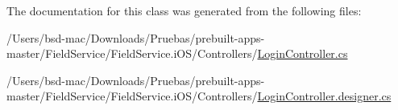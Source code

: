 The documentation for this class was generated from the following files\+:\begin{DoxyCompactItemize}
\item 
/\+Users/bsd-\/mac/\+Downloads/\+Pruebas/prebuilt-\/apps-\/master/\+Field\+Service/\+Field\+Service.\+i\+O\+S/\+Controllers/\hyperlink{_login_controller_8cs}{Login\+Controller.\+cs}\item 
/\+Users/bsd-\/mac/\+Downloads/\+Pruebas/prebuilt-\/apps-\/master/\+Field\+Service/\+Field\+Service.\+i\+O\+S/\+Controllers/\hyperlink{_login_controller_8designer_8cs}{Login\+Controller.\+designer.\+cs}\end{DoxyCompactItemize}
